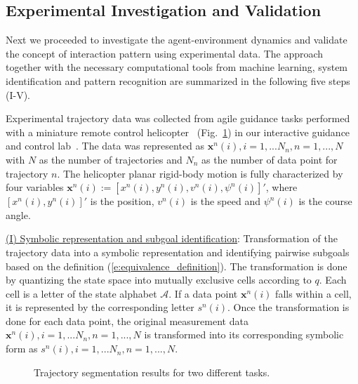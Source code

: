 \documentclass[journal]{IEEEtran}
\begin{document}
\subsection{Experimental Investigation and Validation}

Next we proceeded to investigate the agent-environment dynamics and validate the concept of interaction pattern using experimental data.  The approach together with the necessary computational tools from machine learning, system identification and pattern recognition are summarized in the following five steps (I-V). 

Experimental trajectory data was collected from agile guidance tasks performed with a miniature remote control helicopter~\cite{kong2011investigation} (Fig.~\ref{fig:clustering_total}) in our interactive guidance and control lab~\cite{mettler2012lab}. The data was represented as $\mathbf{x}^n(i), i = 1,...N_n, n = 1,...,N$ with $N$ as the number of trajectories and $N_n$ as the number of data point for trajectory $n$. The helicopter planar rigid-body motion is fully characterized by four variables $\mathbf{x}^n(i):=[x^n(i),y^n(i),v^n(i),\psi^n(i)]'$, where $[x^n(i),y^n(i)]'$ is the position, $v^n(i)$ is the speed and $\psi^n(i)$ is the course angle. 

\underline{(I) Symbolic representation and subgoal identification}: Transformation of the trajectory data into a symbolic representation and identifying pairwise subgoals based on the definition (\ref{e:equivalence_definition}). The transformation is done by quantizing the state space into mutually exclusive cells according to $q$. Each cell is a letter of the state alphabet $\mathcal{A}$. If a data point $\mathbf{x}^n(i)$ falls within a cell, it is represented by the corresponding letter $s^n(i)$. Once the transformation is done for each data point, the original measurement data $\mathbf{x}^n(i), i = 1,...N_n, n = 1,...,N$ is transformed into its corresponding symbolic form as $s^n(i), i = 1,...N_n, n = 1,...,N$.

\begin{figure}[!t]
\centering
{}
\caption{Trajectory segmentation results for two different tasks.} \label{fig:clustering_total}
\end{figure}
\end{document}

